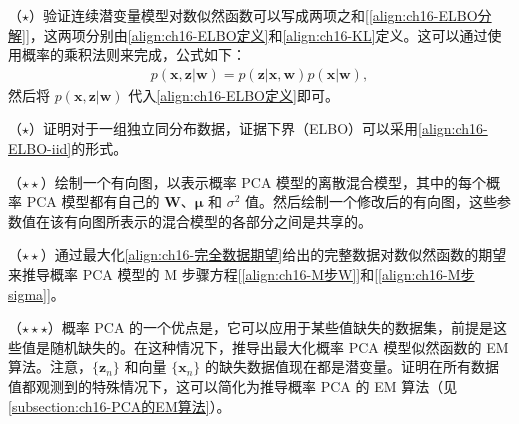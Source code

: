 \documentclass[../../main.tex]{subfiles}
\begin{document}
\begin{exercise}\label{exercise:ch16-18}
（$\star$）验证连续潜变量模型对数似然函数可以写成两项之和[\eqref{align:ch16-ELBO分解}]，这两项分别由\eqref{align:ch16-ELBO定义}和\eqref{align:ch16-KL}定义。这可以通过使用概率的乘积法则来完成，公式如下：
\begin{align}
  p(\bm{x},\bm{z}|\bm{w})=p(\bm{z}|\bm{x},\bm{w})p(\bm{x}|\bm{w}),
  \label{align:ch16-习题16.18乘积}
\end{align}
然后将 $p(\bm{x},\bm{z}|\bm{w})$ 代入\eqref{align:ch16-ELBO定义}即可。
\end{exercise}

\begin{exercise}\label{exercise:ch16-19}
（$\star$）证明对于一组独立同分布数据，证据下界（ELBO）可以采用\eqref{align:ch16-ELBO-iid}的形式。
\end{exercise}

\begin{exercise}\label{exercise:ch16-20}
（$\star\star$）绘制一个有向图，以表示概率 PCA 模型的离散混合模型，其中的每个概率 PCA 模型都有自己的 $\bm{W}$、$\bm{\mu}$ 和 $\sigma^2$ 值。然后绘制一个修改后的有向图，这些参数值在该有向图所表示的混合模型的各部分之间是共享的。
\end{exercise}

\begin{exercise}\label{exercise:ch16-21}
（$\star\star$）通过最大化\eqref{align:ch16-完全数据期望}给出的完整数据对数似然函数的期望来推导概率 PCA 模型的 M 步骤方程[\eqref{align:ch16-M步W}]和[\eqref{align:ch16-M步sigma}]。
\end{exercise}

\begin{exercise}\label{exercise:ch16-22}
（$\star\star\star$）概率 PCA 的一个优点是，它可以应用于某些值缺失的数据集，前提是这些值是随机缺失的。在这种情况下，推导出最大化概率 PCA 模型似然函数的 EM 算法。注意，$\{\bm{z}_n\}$ 和向量 $\{\bm{x}_n\}$ 的缺失数据值现在都是潜变量。证明在所有数据值都观测到的特殊情况下，这可以简化为推导概率 PCA 的 EM 算法（见\cref{subsection:ch16-PCA的EM算法}）。
\end{exercise}
\end{document}
